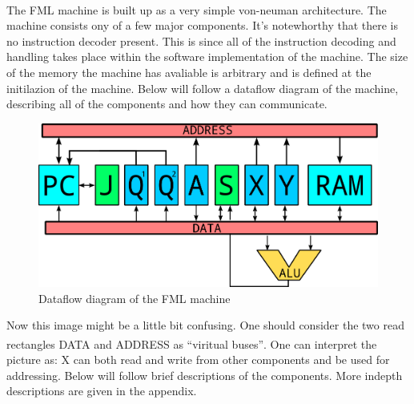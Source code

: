 \documentclass{article}
\begin{document}
The FML machine is built up as a very simple von-neuman
architecture\textsuperscript{\cite{neuman}}. The machine consists ony of a few
major components. It's notewhorthy that there is no instruction decoder present.
This is since all of the instruction decoding
and handling takes place within the software implementation of the machine.
The size of the memory the machine has avaliable is arbitrary and is defined at
the initilazion of the machine. Below will follow a dataflow diagram of the
machine, describing all of the components and how they can communicate.

\begin{figure}[H]
\includegraphics[width=\textwidth,height=\textheight,keepaspectratio]{Dataflow.png}
\caption{Dataflow diagram of the FML machine}
\end{figure}

Now this image might be a little bit confusing. One should consider the two read
rectangles DATA and ADDRESS as ``viritual buses''\textsuperscript{\cite{bus}}.
One can interpret the picture as: X can both read and write from other components and be used for addressing.
Below will follow brief descriptions of the components. More indepth
descriptions are given in the appendix.
\end{document}

